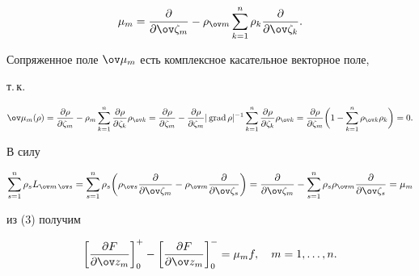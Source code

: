 $$ 


\mu_m=\frac{\partial }{\partial \ov\zeta_m}-\rho_{\ov m} 


\sum^n_{k=1}\rho_k 


\frac{\partial }{\partial \ov\zeta_k}. 


$$ 


Сопряженное поле $\ov\mu_m$ есть комплексное касательное векторное поле, 


т.\,к. 


$$


\ov\mu_m(\rho)=\frac{\partial \rho}{\partial \zeta_m}-\rho_m 


\sum^n_{k=1}\frac{\partial \rho}{\partial \zeta_k}\rho_{\ov k}= 


\frac{\partial \rho}{\partial \zeta_m}- 


\frac{\partial \rho}{\partial \zeta_m}|\grad\rho|^{-1} 


\sum^n_{k=1}\frac{\partial \rho}{\partial \zeta_k}\rho_{\ov k}= 


\frac{\partial \rho}{\partial \zeta_m}\bigg(1-\sum^n_{k=1} 


\rho_{\ov k}\rho_k\bigg)=0. 


$$


 


В силу 


$$ 


\sum^n_{s=1}\rho_s L_{\ov m\,\ov s}=\sum^n_{s=1}\rho_s\bigg( 


\rho_{\ov s}\frac{\partial }{\partial \ov \zeta_m}-\rho_{\ov m} 


\frac{\partial }{\partial \ov \zeta_s}\bigg)= 


\frac{\partial }{\partial \ov \zeta_m}-\sum^n_{s=1} 


\rho_s \rho_{\ov m} 


\frac{\partial }{\partial \ov \zeta_s}=\mu_m 


$$ 


из (3) получим 


\begin{equation} 


\bigg[\frac{\partial F}{\partial \ov z_m}\bigg]^+_0- 


\bigg[\frac{\partial F}{\partial \ov z_m}\bigg]^-_0 


=\mu_m f,\quad m=1,\dotsc,n. 


\end{equation} 


 


